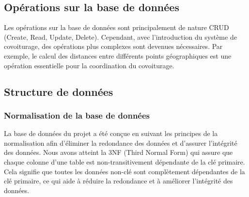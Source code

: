 \subsection{Opérations sur la base de données}\label{subsec:operation-sur-la-base-de-donnees}
Les opérations sur la base de données sont principalement de nature CRUD (Create, Read, Update, Delete).
Cependant, avec l'introduction du système de covoiturage, des opérations plus complexes sont devenues nécessaires.
Par exemple, le calcul des distances entre différents points géographiques est une opération essentielle pour la coordination du covoiturage.

\subsection{Structure de données}\label{subsec:structure-de-donnees}

\subsubsection{Normalisation de la base de données}\label{subsec:normalisation}
La base de données du projet a été conçue en suivant les principes de la normalisation afin d'éliminer la redondance des données et d'assurer l'intégrité des données.
Nous avons atteint la 3NF (Third Normal Form) qui assure que chaque colonne d'une table est non-transitivement dépendante de la clé primaire.
Cela signifie que toutes les données non-clé sont complètement dépendantes de la clé primaire, ce qui aide à réduire la redondance et à améliorer l'intégrité des données.

